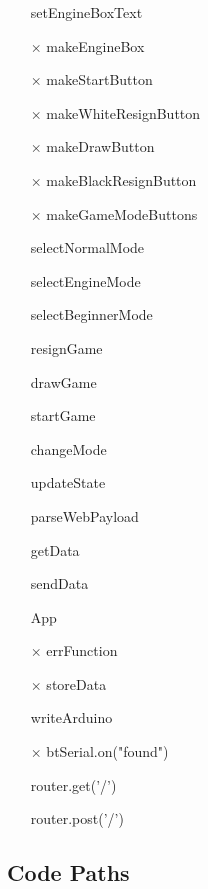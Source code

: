 \documentclass[12pt, titlepage]{article}
\begin{document}
\begin{itemize}
  \item[\checkmark] setEngineBoxText
  \item[$\times$] makeEngineBox
  \item[$\times$] makeStartButton
  \item[$\times$] makeWhiteResignButton
  \item[$\times$] makeDrawButton
  \item[$\times$] makeBlackResignButton
  \item[$\times$] makeGameModeButtons
  \item[\checkmark] selectNormalMode
  \item[\checkmark] selectEngineMode
  \item[\checkmark] selectBeginnerMode
  \item[\checkmark] resignGame
  \item[\checkmark] drawGame
  \item[\checkmark] startGame
  \item[\checkmark] changeMode
  \item[\checkmark] updateState
  \item[\checkmark] parseWebPayload
  \item[\checkmark] getData
  \item[\checkmark] sendData
  \item[\checkmark] App
  \item[$\times$] errFunction
  \item[$\times$] storeData
  \item[\checkmark] writeArduino
  \item[$\times$] btSerial.on("found")
  \item[\checkmark] router.get('/')
  \item[\checkmark] router.post('/')
\end{itemize}

\subsection{Code Paths}\label{CodePaths}
\end{document}

